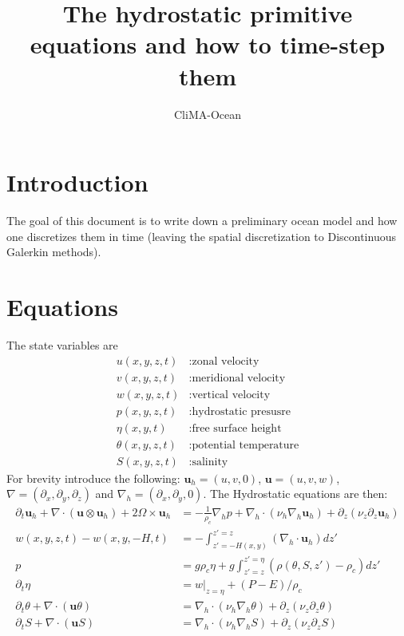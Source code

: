 \documentclass{article}
\title{The hydrostatic primitive equations and how to time-step them}
\author{CliMA-Ocean}
\date{}
\begin{document}
\maketitle

\section{Introduction}
The goal of this document is to write down a preliminary ocean model and how one discretizes them in time (leaving the spatial discretization to Discontinuous Galerkin methods).

\section{Equations}
The state variables are
\begin{align}
    u(x,y,z,t)&: \text{zonal velocity} \\
    v(x,y,z,t)&: \text{meridional velocity}  \\
    w(x,y,z,t)&: \text{vertical velocity}  \\
    p(x,y,z,t)&: \text{hydrostatic presusre}  \\
    \eta(x,y,t)&: \text{free surface height}  \\
    \theta(x,y,z,t)&: \text{potential temperature} \\
    S(x,y,z,t)&: \text{salinity}
\end{align}
For brevity introduce the following:
$\bm{u}_h = (u,v,0)$, $\bm{u} = (u,v,w)$, $\nabla = (\partial_x, \partial_y, \partial_z)$ and $\nabla_h = (\partial_x , \partial_y , 0)$. The Hydrostatic equations are then: 
\begin{align}
    \partial_t \bm{u}_h + \nabla \cdot \left( \bm{u} \otimes \bm{u}_h  \right) + 2 \Omega \times \bm{u}_h &= - \frac{1}{\rho_c} \nabla_h p + \nabla_h \cdot \left( \nu_h  \nabla_h \bm{u}_h \right) + \partial_z \left( \nu_z \partial_z \bm{u}_h \right) \\
          w(x,y,z,t) - w(x,y,-H,t) &= - \int_{z' = -H(x,y)}^{z' = z} \left( \nabla_h \cdot \bm{u}_h \right) dz' \\
      p &= g \rho_c \eta + g\int^{z' = \eta}_{z' = z} \left( \rho(\theta, S, z') - \rho_c \right) dz' \\
    \partial_t \eta  &= w|_{z=\eta} +  \left(P - E \right)/\rho_c 
    \\
    \partial_t \theta + \nabla \cdot \left( \bm{u} \theta  \right) &= \nabla_h \cdot \left( \nu_h  \nabla_h \theta \right) + \partial_z \left( \nu_z \partial_z \theta \right)
        \\
      \partial_t S + \nabla \cdot \left( \bm{u} S  \right) &= \nabla_h \cdot \left( \nu_h  \nabla_h S\right) + \partial_z \left( \nu_z \partial_z  S \right)
\end{align}
\end{document}

